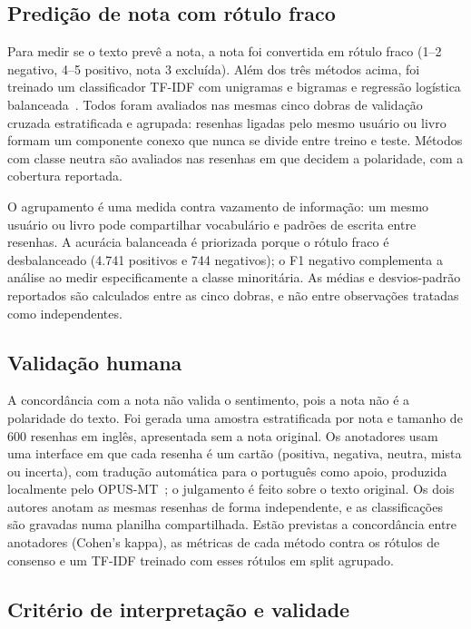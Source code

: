 \documentclass[conference]{IEEEtran}
\begin{document}
\subsection{Predição de nota com rótulo fraco}

Para medir se o texto prevê a nota, a nota foi convertida em rótulo fraco
(1--2 negativo, 4--5 positivo, nota 3 excluída). Além dos três métodos acima,
foi treinado um classificador TF-IDF com unigramas e bigramas e regressão
logística balanceada~\cite{pang2002,sklearn}. Todos foram avaliados nas mesmas
cinco dobras de validação cruzada estratificada e agrupada: resenhas ligadas
pelo mesmo usuário ou livro formam um componente conexo que nunca se divide
entre treino e teste. Métodos com classe neutra são avaliados nas resenhas em
que decidem a polaridade, com a cobertura reportada.

O agrupamento é uma medida contra vazamento de informação: um mesmo usuário ou
livro pode compartilhar vocabulário e padrões de escrita entre resenhas. A
acurácia balanceada é priorizada porque o rótulo fraco é desbalanceado
(4.741 positivos e 744 negativos); o F1 negativo complementa a análise ao
medir especificamente a classe minoritária. As médias e desvios-padrão
reportados são calculados entre as cinco dobras, e não entre observações
tratadas como independentes.

\subsection{Validação humana}

A concordância com a nota não valida o sentimento, pois a nota não é a
polaridade do texto. Foi gerada uma amostra estratificada por nota e tamanho de
600 resenhas em inglês, apresentada sem a nota original. Os anotadores usam uma
interface em que cada resenha é um cartão (positiva, negativa, neutra, mista ou
incerta), com tradução automática para o português como apoio, produzida
localmente pelo OPUS-MT~\cite{opusmt}; o julgamento é feito sobre o texto
original. Os dois autores anotam as mesmas resenhas de forma independente, e as
classificações são gravadas numa planilha compartilhada. Estão previstas a
concordância entre anotadores (Cohen's kappa), as métricas de cada método
contra os rótulos de consenso e um TF-IDF treinado com esses rótulos em split
agrupado.

\subsection{Critério de interpretação e validade}
\end{document}
